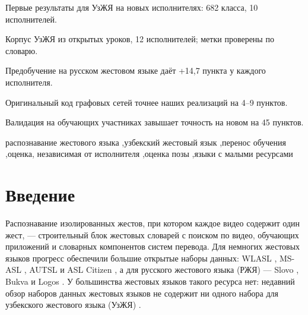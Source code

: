 \documentclass[a4paper,fleqn]{cas-dc}
\begin{document}
\begin{highlights}
\item Первые результаты для УзЖЯ на новых исполнителях: 682 класса, 10 исполнителей.
\item Корпус УзЖЯ из открытых уроков, 12 исполнителей; метки проверены по словарю.
\item Предобучение на русском жестовом языке даёт +14,7 пункта у каждого исполнителя.
\item Оригинальный код графовых сетей точнее наших реализаций на 4–9 пунктов.
\item Валидация на обучающих участниках завышает точность на новом на 45 пунктов.
\end{highlights}
\begin{keywords}
распознавание жестового языка \sep узбекский жестовый язык \sep перенос обучения \sep оценка, независимая от исполнителя \sep оценка позы \sep языки с малыми ресурсами
\end{keywords}
\maketitle
\hypertarget{ux432ux432ux435ux434ux435ux43dux438ux435}{%
\section{Введение}\label{ux432ux432ux435ux434ux435ux43dux438ux435}}

Распознавание изолированных жестов, при котором каждое видео содержит один жест, --- строительный блок жестовых словарей с поиском по видео, обучающих приложений и словарных компонентов систем перевода. Для немногих жестовых языков прогресс обеспечили большие открытые наборы данных: WLASL \cite{2020_li_wlasl}, MS-ASL \cite{2019_joze_msasl}, AUTSL \cite{2020_sincan_autsl} и ASL Citizen \cite{2023_desai_asl_citizen}, а для русского жестового языка (РЖЯ) --- Slovo \cite{2023_kapitanov_slovo}, Bukva \cite{2024_kvanchiani_bukva} и Logos \cite{2025_ovodov_logos}. У большинства жестовых языков такого ресурса нет: недавний обзор наборов данных жестовых языков не содержит ни одного набора для узбекского жестового языка (УзЖЯ) \cite{2026_ni_sign_language_datasets_survey}.
\end{document}

